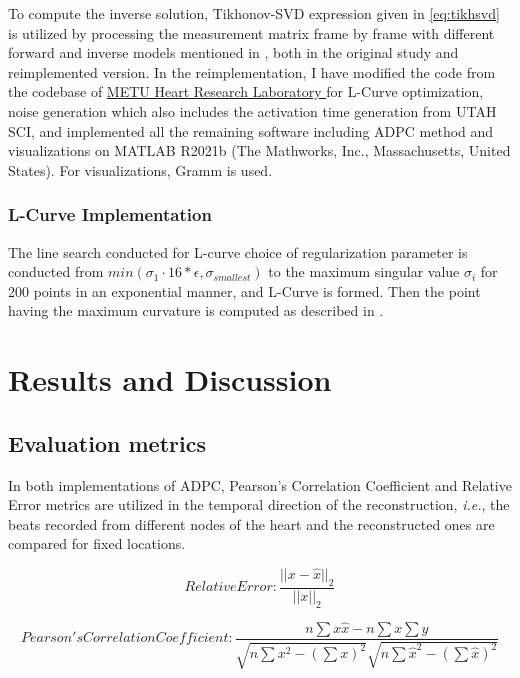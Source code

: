 \documentclass[draftcls, onecolumn, journal]{IEEEtran}
\begin{document}
To compute the inverse solution, Tikhonov-SVD expression given in \eqref{eq:tikhsvd} is utilized by processing the measurement matrix frame by frame with different forward and inverse models mentioned in , both in the original study and reimplemented version. In the reimplementation, I have modified the code from the codebase of \href{http://hrl.eee.metu.edu.tr/}{METU Heart Research Laboratory \faExternalLink*} for L-Curve optimization, noise generation which also includes the activation time generation from UTAH SCI\cite*{ActDetect}, and implemented all the remaining software including ADPC method and visualizations on MATLAB R2021b (The Mathworks, Inc., Massachusetts, United States). For visualizations, Gramm \cite*{morel2018gramm} is used. 

\subsubsection{L-Curve Implementation}

The line search conducted for L-curve choice of regularization parameter is conducted from $min(\sigma_1\cdot 16*\epsilon, \sigma_{smallest})$ to the maximum singular value $\sigma_i$ for 200 points in an exponential manner, and L-Curve is formed. Then the point having the maximum curvature is computed as described in \cite*{hansen1993use}.



\newpage

\section{Results and Discussion}\label{sec:discussion}

\subsection{Evaluation metrics}

In both implementations of ADPC, Pearson's Correlation Coefficient and Relative Error metrics are utilized in the temporal direction of the reconstruction, \textit{i.e.}, the beats recorded from different nodes of the heart and the reconstructed ones are compared for fixed locations. 

\begin{equation}
    Relative Error: \frac{||x-\hat{x}||_2}{||x||_2}
\end{equation}

\begin{equation}
    Pearson's Correlation Coefficient: \frac{n\sum x \hat{x} - n \sum x \sum y}{\sqrt{n\sum x^2 - (\sum x)^2}\sqrt{n\sum {\hat{x}}^2 - (\sum \hat{x})^2}}
\end{equation}
\end{document}
